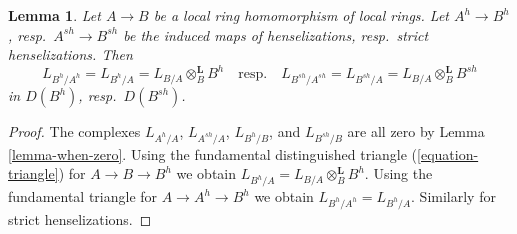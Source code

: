 \documentclass[10pt,a4paper]{amsart}
\theoremstyle{plain}
\newtheorem{lemma}[subsection]{Lemma}
\theoremstyle{definition}
\theoremstyle{remark}
\numberwithin{equation}{subsection}
\begin{document}
\begin{lemma}
\label{lemma-cotangent-complex-henselization}
Let $A \to B$ be a local ring homomorphism of local rings.
Let $A^h \to B^h$, resp.\ $A^{sh} \to B^{sh}$ be the induced
maps of henselizations, resp.\ strict henselizations.
Then
$$
L_{B^h/A^h} = L_{B^h/A} = L_{B/A} \otimes_B^\mathbf{L} B^h
\quad\text{resp.}\quad
L_{B^{sh}/A^{sh}} = L_{B^{sh}/A} = L_{B/A} \otimes_B^\mathbf{L} B^{sh}
$$
in $D(B^h)$, resp.\ $D(B^{sh})$.
\end{lemma}

\begin{proof}
The complexes $L_{A^h/A}$, $L_{A^{sh}/A}$, $L_{B^h/B}$, and
$L_{B^{sh}/B}$ are all zero by Lemma \ref{lemma-when-zero}.
Using the fundamental distinguished triangle (\ref{equation-triangle})
for $A \to B \to B^h$ we obtain
$L_{B^h/A} = L_{B/A} \otimes_B^\mathbf{L} B^h$.
Using the fundamental triangle for $A \to A^h \to B^h$
we obtain $L_{B^h/A^h} = L_{B^h/A}$.
Similarly for strict henselizations.
\end{proof}
\end{document}
